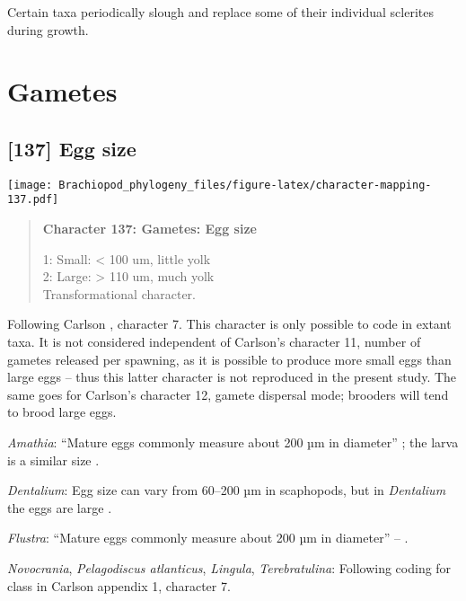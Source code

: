 \documentclass[openany]{book}
\theoremstyle{definition}
\theoremstyle{definition}
\theoremstyle{definition}
\theoremstyle{remark}
\begin{document}
Certain taxa periodically slough and replace some of their individual
sclerites during growth.

\section{Gametes}\label{gametes}

\subsection*{{[}137{]} Egg size}\label{egg-size}

\texttt{[image: Brachiopod\_phylogeny\_files/figure-latex/character-mapping-137.pdf]}

\begin{quote}
\textbf{Character 137: Gametes: Egg size}

1: Small: \textless{} 100 um, little yolk\\
2: Large: \textgreater{} 110 um, much yolk\\
Transformational character.
\end{quote}

Following Carlson \citeyearpar{Carlson1995Phylogeneticrelationships},
character 7. This character is only possible to code in extant taxa. It
is not considered independent of Carlson's character 11, number of
gametes released per spawning, as it is possible to produce more small
eggs than large eggs -- thus this latter character is not reproduced in
the present study. The same goes for Carlson's character 12, gamete
dispersal mode; brooders will tend to brood large eggs.

\hypertarget{Amathia-coding-137}{}
\emph{Amathia}: ``Mature eggs commonly measure about 200 µm in
diameter'' \citep{Franzen1977}; the larva is a similar size
\citep{Reed1982}.

\hypertarget{Dentalium-coding-137}{}
\emph{Dentalium}: Egg size can vary from 60--200 µm in scaphopods, but
in \emph{Dentalium} the eggs are large \citep{DufresneDube1983}.

\hypertarget{Flustra-coding-137}{}
\emph{Flustra}: ``Mature eggs commonly measure about 200 µm in
diameter'' -- \citet{Franzen1977}.

\hypertarget{Lingula-coding-137}{}
\emph{Novocrania}, \emph{Pelagodiscus atlanticus}, \emph{Lingula},
\emph{Terebratulina}: Following coding for class in Carlson
\citeyearpar{Carlson1995Phylogeneticrelationships} appendix 1, character
7.
\end{document}

